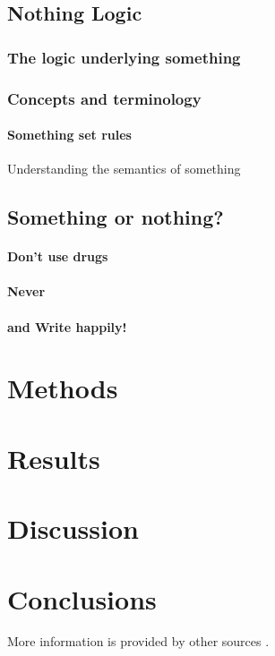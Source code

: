 \documentclass[12pt,twoside]{report}
\begin{document}
 	\section{Nothing Logic}
	\label{sec:notlogic}
	{
		\subsection{The logic underlying something}
		\label{subsec:logicunderlying}
    	{
    	}
    	
		\subsection{Concepts and terminology}
		\label{subsec:conceptsterm}	
		{
    		\subsubsection*{Something set rules}
    		{
    		Understanding the semantics of something
    		
    		}
		}
		
        
    }
	\section{Something or nothing?}
	\label{sec:someornot}
	{
    	\subsubsection{Don't use drugs}
    	{
    	}
    	\subsubsection{Never}	
    	{
    	}
    	
    	\subsubsection{and Write happily!}
    	{
    	
    	}
    }

	
\chapter{Methods}
\label{ch:methods}

\chapter{Results}
\label{ch:results}

\chapter{Discussion}
\label{ch:discussion}

\chapter{Conclusions}
\label{ch:conclusion}
{
More information is provided by other sources \cite{mittelbach2004latex, goossens1994latex}.
}
\pagestyle{fancy}
\fancyhf{}
\fancyhead[LE,RO]{\nouppercase{\rightmark}}
\fancyfoot[LE,RO]{\thepage}
\renewcommand{\headrulewidth}{1.0pt}



\end{document}
